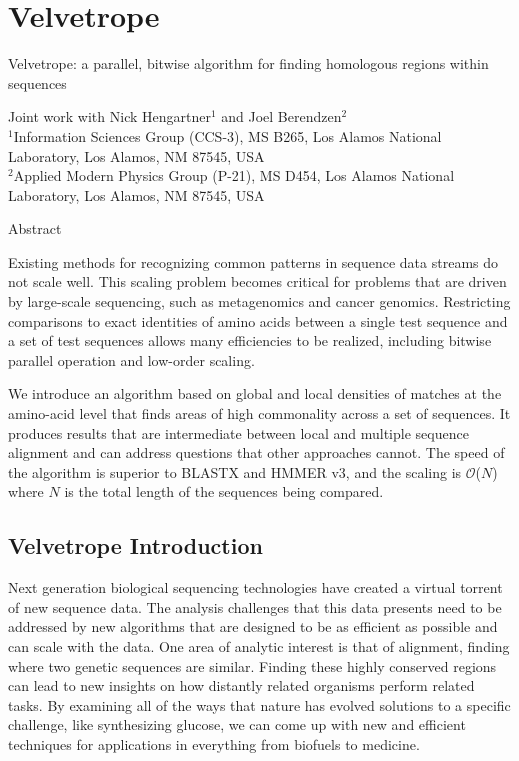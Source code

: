 \documentclass[phd,tocprelim]{cornell}
\begin{document}


\part{Velvetrope} %
\label{prt:Velvetrope}
\singlespacing

\noindent
\Large
Velvetrope: a parallel, bitwise algorithm for finding homologous regions within sequences

\noindent
\normalsize
Joint work with Nick Hengartner$^{1}$ and Joel Berendzen$^{2}$ \\
\scriptsize
$^{1}$Information Sciences Group (CCS-3), MS B265, Los Alamos National
 Laboratory, Los Alamos, NM 87545, USA \\
$^{2}$Applied Modern Physics Group (P-21), MS D454, Los Alamos National
 Laboratory, Los Alamos, NM 87545, USA
\normalsize

\normalspacing

\begin{center}
   Abstract 
\end{center}

Existing methods for recognizing common patterns in sequence data
streams do not scale well. This scaling problem becomes critical for
problems that are driven by large-scale sequencing, such as
metagenomics and cancer genomics.  Restricting comparisons to exact
identities of amino acids between a single test sequence and a set of
test sequences allows many efficiencies to be realized, including
bitwise parallel operation and low-order scaling.

We introduce an algorithm based on global and local densities of
matches at the amino-acid level that finds areas of high commonality
across a set of sequences.  It produces results that are intermediate
between local and multiple sequence alignment and can address
questions that other approaches cannot.  The speed of the
algorithm is superior to BLASTX and HMMER v3, and the scaling is
$\mathcal{O}$($N$) where $N$ is the total length of the sequences
being compared.

\chapter{Velvetrope Introduction} %
\label{cha:Velvetrope Introduction}
\noindent
Next generation biological sequencing technologies have created a virtual torrent of new sequence data. The analysis challenges that this data presents need to be addressed by new algorithms that are designed to be as efficient as possible and can scale with the data. One area of analytic interest is that of alignment, finding where two genetic sequences are similar. Finding these highly conserved regions can lead to new insights on how distantly related organisms perform related tasks. By examining all of the ways that nature has evolved solutions to a specific challenge, like synthesizing glucose, we can come up with new and efficient techniques for applications in everything from biofuels to medicine.
\end{document}
